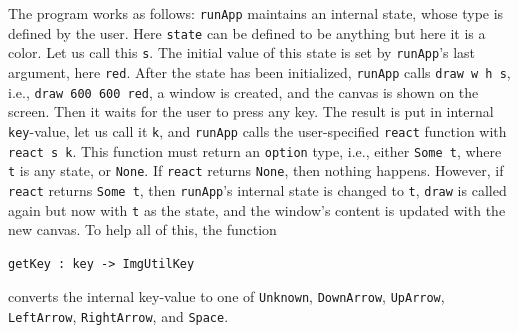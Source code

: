 \documentclass{article}
\begin{document}
The program works as follows: \lstinline{runApp} maintains an internal state, whose type is defined by the user. Here \lstinline{state} can be defined to be anything but here it is a color. Let us call this \lstinline{s}. The initial value of this state is set by \lstinline{runApp}'s last argument, here \lstinline{red}. After the state has been initialized, \lstinline{runApp} calls \lstinline{draw w h s}, i.e., \lstinline{draw 600 600 red}, a window is created, and the canvas is shown on the screen. Then it waits for the user to press any key. The result is put in internal \lstinline{key}-value, let us call it \lstinline{k}, and \lstinline{runApp} calls the user-specified \lstinline{react} function with \lstinline{react s k}. This function must return an \lstinline{option} type, i.e., either \lstinline{Some t}, where \lstinline{t} is any state, or \lstinline{None}. If \lstinline{react} returns \lstinline{None}, then nothing happens. However, if \lstinline{react} returns \lstinline{Some t}, then \lstinline{runApp}'s internal state is changed to \lstinline{t}, \lstinline{draw} is called again but now with \lstinline{t} as the state, and the window's content is updated with the new canvas. To help all of this, the function
\begin{lstlisting}
getKey : key -> ImgUtilKey
\end{lstlisting}
converts the internal key-value to one of \lstinline{Unknown}, \lstinline{DownArrow}, \lstinline{UpArrow}, \lstinline{LeftArrow}, \lstinline{RightArrow}, and \lstinline{Space}.
\end{document}
